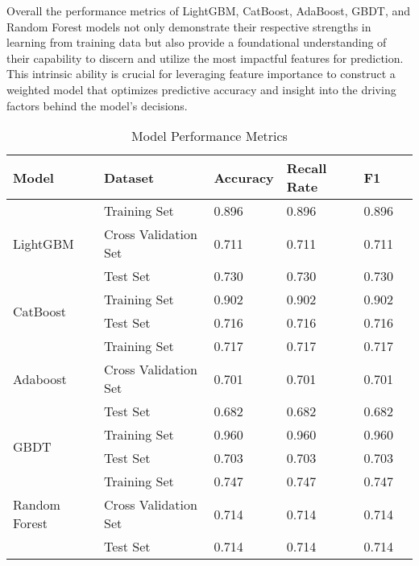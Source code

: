 \documentclass{mcmthesis}
\begin{document}
Overall the performance metrics of LightGBM, CatBoost, AdaBoost, GBDT, and Random Forest models not only demonstrate their respective strengths in learning from training data but also provide a foundational understanding of their capability to discern and utilize the most impactful features for prediction. This intrinsic ability is crucial for leveraging feature importance to construct a weighted model that optimizes predictive accuracy and insight into the driving factors behind the model's decisions.
\begin{table}[htbp]
    \centering
    \caption{Model Performance Metrics}
    \begin{tabular}{@{}llllll@{}}
        \toprule
        \textbf{Model}                 & \textbf{Dataset}     & \textbf{Accuracy} & \textbf{Recall Rate} & \textbf{F1} & \\ \midrule
        \multirow{3}{*}{LightGBM}      & Training Set         & 0.896             & 0.896                & 0.896       & \\
                                       & Cross Validation Set & 0.711             & 0.711                & 0.711       & \\
                                       & Test Set             & 0.730             & 0.730                & 0.730       & \\
        \midrule
        \multirow{2}{*}{CatBoost}      & Training Set         & 0.902             & 0.902                & 0.902       & \\
                                       & Test Set             & 0.716             & 0.716                & 0.716       & \\
        \midrule
        \multirow{3}{*}{Adaboost}      & Training Set         & 0.717             & 0.717                & 0.717       & \\
                                       & Cross Validation Set & 0.701             & 0.701                & 0.701       & \\
                                       & Test Set             & 0.682             & 0.682                & 0.682       & \\
        \midrule
        \multirow{2}{*}{GBDT}          & Training Set         & 0.960             & 0.960                & 0.960       & \\
                                       & Test Set             & 0.703             & 0.703                & 0.703       & \\
        \midrule
        \multirow{3}{*}{Random Forest} & Training Set         & 0.747             & 0.747                & 0.747       & \\
                                       & Cross Validation Set & 0.714             & 0.714                & 0.714       & \\
                                       & Test Set             & 0.714             & 0.714                & 0.714       & \\
        \bottomrule
    \end{tabular}\label{table:5_2}
\end{table}
\end{document}
